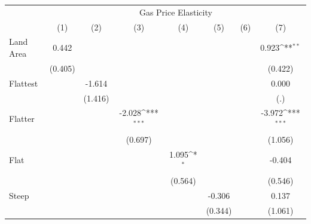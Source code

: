 {
\def\sym#1{\ifmmode^{#1}\else\(^{#1}\)\fi}
\begin{tabular}{l*{7}{c}}
\hline\hline
            &\multicolumn{7}{c}{Gas Price Elasticity}                                                                                                                 \\
            &\multicolumn{1}{c}{(1)}         &\multicolumn{1}{c}{(2)}         &\multicolumn{1}{c}{(3)}         &\multicolumn{1}{c}{(4)}         &\multicolumn{1}{c}{(5)}         &\multicolumn{1}{c}{(6)}         &\multicolumn{1}{c}{(7)}         \\
\hline
Land Area   &       0.442         &                     &                     &                     &                     &                     &       0.923\sym{**} \\
            &     (0.405)         &                     &                     &                     &                     &                     &     (0.422)         \\
[1em]
Flattest    &                     &      -1.614         &                     &                     &                     &                     &       0.000         \\
            &                     &     (1.416)         &                     &                     &                     &                     &         (.)         \\
[1em]
Flatter     &                     &                     &      -2.028\sym{***}&                     &                     &                     &      -3.972\sym{***}\\
            &                     &                     &     (0.697)         &                     &                     &                     &     (1.056)         \\
[1em]
Flat        &                     &                     &                     &       1.095\sym{*}  &                     &                     &      -0.404         \\
            &                     &                     &                     &     (0.564)         &                     &                     &     (0.546)         \\
[1em]
Steep       &                     &                     &                     &                     &      -0.306         &                     &       0.137         \\
            &                     &                     &                     &                     &     (0.344)         &                     &     (1.061)         \\

\end{tabular}}
